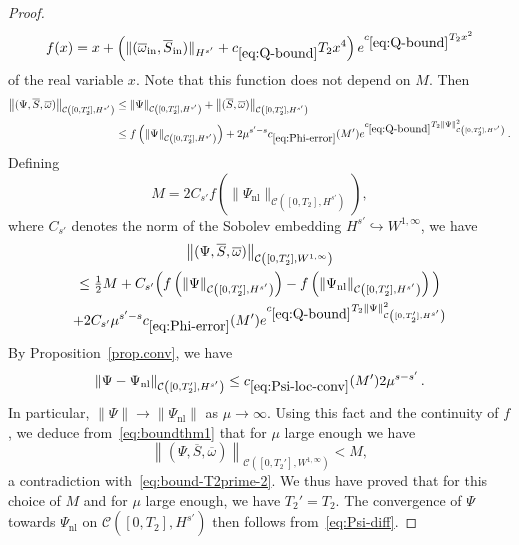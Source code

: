 \documentclass[AHL,Unicode,longabstracts,published]{cedram}
\newcommand{\rmin}{\mathrm{in}}
\newcommand{\nl}{\mathrm{nl}}
\newcommand{\cC}{\mathcal{C}}
\newcommand\ii{{\ensuremath {\infty}}}
\begin{document}
\begin{proof}
\begin{equation*}
f(x)=x + \left(\|(\overline\omega_\rmin, \overline{S}_\rmin)\|_{H^{s'}} + c_{\eqref{eq:Q-bound}} T_2 x^4\right) e^{c_{\eqref{eq:Q-bound}} T_2 x^2}
\end{equation*}
of the real variable $x$. Note that this function does not depend on $M$. Then
\begin{align*}
\left\|(\Psi, \overline{S},\overline{\omega})\right\|_{\cC\left([0,T_2'], {H}^{s'}\right)} &\leq \|\Psi\|_{\cC\left([0,T_2'], {H}^{s'}\right)} + \left\|(\overline{S}, \overline{\omega})\right\|_{\cC\left([0,T_2'], H^{s'}\right)} \\
&\leq f\left(\|\Psi\|_{\cC\left([0,T_2'], {H}^{s'}\right)}\right) + 2\mu^{s'-s} c_{\eqref{eq:Phi-error}}(M') e^{c_{\eqref{eq:Q-bound}} T_2 \|\Psi\|_{\cC\left([0,T_2'], H^{s'}\right)}^2}\,.\\
\end{align*}
Defining
\begin{equation*}
M= 2 C_{s'} f\left(\|\Psi_{\nl}\|_{\cC\left([0,T_2], {H}^{s'}\right)}\right),
\end{equation*}
where $C_{s'}$ denotes the norm of the Sobolev embedding ${H}^{s'}\hookrightarrow W^{1,\infty}$, we have
\begin{multline}\label{eq:boundthm1}
\left\|(\Psi, \overline{S},\overline{\omega})\right\|_{\cC\left([0,T_2'], W^{1,\ii}\right)}\\
\leq \tfrac12 M + C_{s'}\Big(f\left(\|\Psi\|_{\cC\left([0,T_2'], {H}^{s'}\right)}\right)-f\left(\|\Psi_{\nl}\|_{\cC\left([0,T_2'], {H}^{s'}\right)}\right)\Big) \\
+ 2C_{s'} \mu^{s'-s} c_{\eqref{eq:Phi-error}}(M') e^{c_{\eqref{eq:Q-bound}} T_2 \|\Psi\|_{\cC\left([0,T_2'], H^{s'}\right)}^2}
\end{multline}
By Proposition~\ref{prop.conv}, we have
\begin{equation}\label{eq:Psi-diff}
\|\Psi-\Psi_{\nl}\|_{\cC\left([0, T_2'],H^{s'}\right)}\leq c_{\eqref{eq:Psi-loc-conv}}(M') 2\mu^{s-s'}\,.
\end{equation}
In particular, $\|\Psi\| \to \|\Psi_\nl\|$ as $\mu\to\infty$. Using this fact and the continuity of $f$, we deduce from~\eqref{eq:boundthm1} that for $\mu$ large enough we have
\[
\left\|(\Psi, \overline{S},\overline{\omega})\right\|_{\cC\left([0,T_2'], W^{1,\ii}\right)}<M,
\]
a contradiction with~\eqref{eq:bound-T2prime-2}. We thus have proved that for this choice of $M$ and for $\mu$ large enough, we have $T_2'=T_2$. The convergence of $\Psi$ towards $\Psi_{\nl}$ on $\cC([0,T_2],H^{s'})$ then follows from~\eqref{eq:Psi-diff}.
\end{proof}
\end{document}
